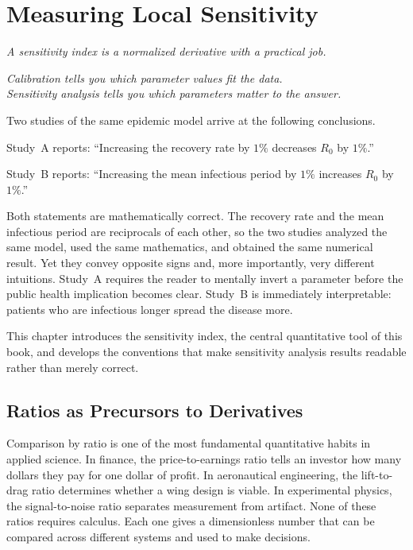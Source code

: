 \chapter{Measuring Local Sensitivity}

\begin{flushright}
\textit{A sensitivity index is a normalized derivative with a practical job.}

\medskip
\textit{Calibration tells you which parameter values fit the data.\\
Sensitivity analysis tells you which parameters matter to the answer.}
\end{flushright}

\bigskip

Two studies of the same epidemic model arrive at the following conclusions.

Study~A reports: ``Increasing the recovery rate by $1\%$ decreases $R_0$ by $1\%$.''

Study~B reports: ``Increasing the mean infectious period by $1\%$ increases $R_0$ by $1\%$.''

Both statements are mathematically correct. The recovery rate and
the mean infectious period are reciprocals of each other, so the
two studies analyzed the same model, used the same mathematics,
and obtained the same numerical result. Yet they convey opposite
signs and, more importantly, very different intuitions.
Study~A requires the reader to mentally invert a parameter before
the public health implication becomes clear.
Study~B is immediately interpretable: patients who are infectious
longer spread the disease more.

This chapter introduces the sensitivity index, the central
quantitative tool of this book, and develops the conventions
that make sensitivity analysis results readable rather than
merely correct.

\section{Ratios as Precursors to Derivatives}
\label{sec:ratios}

Comparison by ratio is one of the most fundamental quantitative
habits in applied science.
In finance, the price-to-earnings ratio tells an investor how many
dollars they pay for one dollar of profit.
In aeronautical engineering, the lift-to-drag ratio determines
whether a wing design is viable.
In experimental physics, the signal-to-noise ratio separates
measurement from artifact.
None of these ratios requires calculus. Each one gives a
dimensionless number that can be compared across different systems
and used to make decisions.

